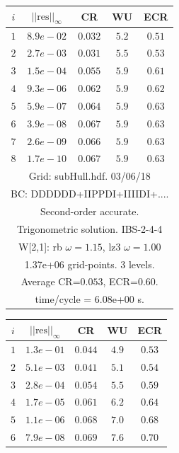 \begin{table}[hbt]
\begin{center}
{\begin{tabular}{|c|c|c|c|c|}
\hline 
\end{tabular}
\begin{tabular}{|c|c|c|c|c|} \hline 
 $i$   & $\vert\vert\mbox{res}\vert\vert_\infty$  &  CR     &  WU    & ECR  \\   \hline 
 $ 1$  & $ 8.9e-02$ & $0.032$ & $ 5.2$ & $0.51$ \\ 
 $ 2$  & $ 2.7e-03$ & $0.031$ & $ 5.5$ & $0.53$ \\ 
 $ 3$  & $ 1.5e-04$ & $0.055$ & $ 5.9$ & $0.61$ \\ 
 $ 4$  & $ 9.3e-06$ & $0.062$ & $ 5.9$ & $0.62$ \\ 
 $ 5$  & $ 5.9e-07$ & $0.064$ & $ 5.9$ & $0.63$ \\ 
 $ 6$  & $ 3.9e-08$ & $0.067$ & $ 5.9$ & $0.63$ \\ 
 $ 7$  & $ 2.6e-09$ & $0.066$ & $ 5.9$ & $0.63$ \\ 
 $ 8$  & $ 1.7e-10$ & $0.067$ & $ 5.9$ & $0.63$ \\ 
\hline 
\multicolumn{5}{|c|}{Grid: subHull.hdf. 03/06/18}  \\
\multicolumn{5}{|c|}{BC: DDDDDD+IIPPDI+IIIIDI+....}  \\
\multicolumn{5}{|c|}{Second-order accurate.}  \\
\multicolumn{5}{|c|}{Trigonometric solution. IBS-2-4-4 }  \\
\multicolumn{5}{|c|}{W[2,1]: rb $\omega=1.15$, lz3 $\omega=1.00$}  \\
\multicolumn{5}{|c|}{1.37e+06 grid-points. 3 levels.}  \\
\multicolumn{5}{|c|}{Average CR=$0.053$, ECR=$0.60$.}  \\
\multicolumn{5}{|c|}{time/cycle = 6.08e+00 s.}  \\
\hline 
\end{tabular}
\begin{tabular}{|c|c|c|c|c|} \hline 
 $i$   & $\vert\vert\mbox{res}\vert\vert_\infty$  &  CR     &  WU    & ECR  \\   \hline 
 $ 1$  & $ 1.3e-01$ & $0.044$ & $ 4.9$ & $0.53$ \\ 
 $ 2$  & $ 5.1e-03$ & $0.041$ & $ 5.1$ & $0.54$ \\ 
 $ 3$  & $ 2.8e-04$ & $0.054$ & $ 5.5$ & $0.59$ \\ 
 $ 4$  & $ 1.7e-05$ & $0.061$ & $ 6.2$ & $0.64$ \\ 
 $ 5$  & $ 1.1e-06$ & $0.068$ & $ 7.0$ & $0.68$ \\ 
 $ 6$  & $ 7.9e-08$ & $0.069$ & $ 7.6$ & $0.70$ \\ 

\end{tabular}}
\end{center}
\end{table}

